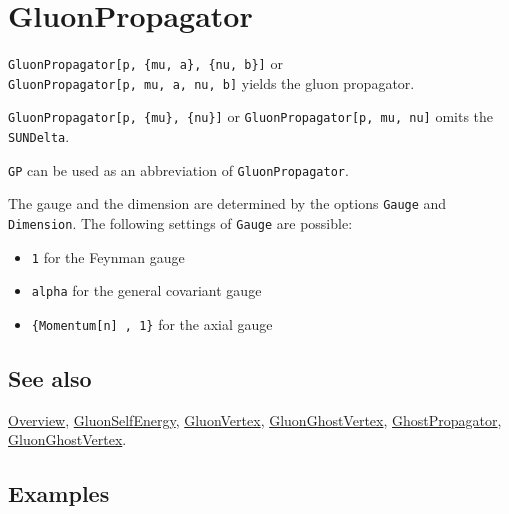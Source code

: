 \documentclass[../FeynCalcManual.tex]{subfiles}
\begin{document}
\hypertarget{gluonpropagator}{
\section{GluonPropagator}\label{gluonpropagator}}

\texttt{GluonPropagator[\allowbreak{}p,\ \allowbreak{}\{\allowbreak{}mu,\ \allowbreak{}a\},\ \allowbreak{}\{\allowbreak{}nu,\ \allowbreak{}b\}]}
or
\texttt{GluonPropagator[\allowbreak{}p,\ \allowbreak{}mu,\ \allowbreak{}a,\ \allowbreak{}nu,\ \allowbreak{}b]}
yields the gluon propagator.

\texttt{GluonPropagator[\allowbreak{}p,\ \allowbreak{}\{\allowbreak{}mu\},\ \allowbreak{}\{\allowbreak{}nu\}]}
or
\texttt{GluonPropagator[\allowbreak{}p,\ \allowbreak{}mu,\ \allowbreak{}nu]}
omits the \texttt{SUNDelta}.

\texttt{GP} can be used as an abbreviation of \texttt{GluonPropagator}.

The gauge and the dimension are determined by the options \texttt{Gauge}
and \texttt{Dimension}. The following settings of \texttt{Gauge} are
possible:

\begin{itemize}
\tightlist
\item
  \texttt{1} for the Feynman gauge
\item
  \texttt{alpha} for the general covariant gauge
\item
  \texttt{\{\allowbreak{}Momentum[\allowbreak{}n] ,\ \allowbreak{}1\}}
  for the axial gauge
\end{itemize}

\subsection{See also}

\hyperlink{toc}{Overview}, \hyperlink{gluonselfenergy}{GluonSelfEnergy},
\hyperlink{gluonvertex}{GluonVertex},
\hyperlink{gluonghostvertex}{GluonGhostVertex},
\hyperlink{ghostpropagator}{GhostPropagator},
\hyperlink{gluonghostvertex}{GluonGhostVertex}.

\subsection{Examples}

\begin{Shaded}
\begin{Highlighting}[]
\OperatorTok{[}\OperatorTok{,} \SpecialCharTok{\textbackslash{}}\OperatorTok{[}\OperatorTok{],} \OperatorTok{,} \SpecialCharTok{\textbackslash{}}\OperatorTok{[}\OperatorTok{],} \OperatorTok{]} 
 
\OperatorTok{[}\SpecialCharTok{\%}\OperatorTok{]}
\end{Highlighting}
\end{Shaded}
\end{document}
